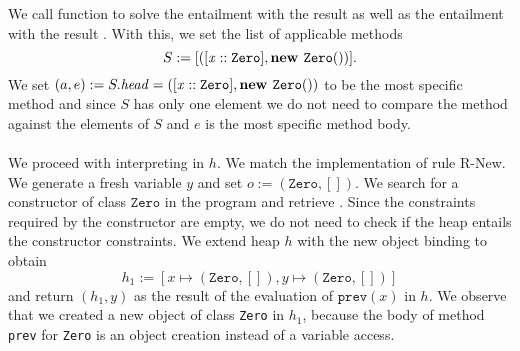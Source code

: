 \begin{example}
We call function  to solve the entailment
with the result 
as well as the entailment
with the result .
With this, we set the list of applicable methods
\[ S := [([\mathit{x} :: \mathit{\texttt{Zero}}], \textbf{new } \mathit{\texttt{Zero}}())]. \]
We set $(a, e) := S.\mathit{head} = ([\mathit{x} :: \mathit{\texttt{Zero}}], \textbf{new } \mathit{\texttt{Zero}}())$
to be the most specific method
and since $S$ has only one element we do not need to compare
the method against the elements of $S$
and $e$ is the most specific method body.\\
\\
We proceed with interpreting  in $h$.
We match the implementation of rule R-New.
We generate a fresh variable $y$
and set $o := (\texttt{Zero}, [])$.
We search for a constructor of class $\texttt{Zero}$ in the program
and retrieve .
Since the constraints required by the constructor are empty,
we do not need to check if the heap entails the constructor constraints.
We extend heap $h$ with the new object binding to obtain
\[ h_1 := [x \mapsto (\texttt{Zero}, []), y \mapsto (\texttt{Zero}, [])] \]
and return $(h_1, y)$ as the result of the evaluation of $\texttt{prev}(x)$ in $h$.
We observe that we created a new object of class \texttt{Zero} in $h_1$,
because the body of method \texttt{prev} for \texttt{Zero}
is an object creation instead of a variable access.
\end{example}

